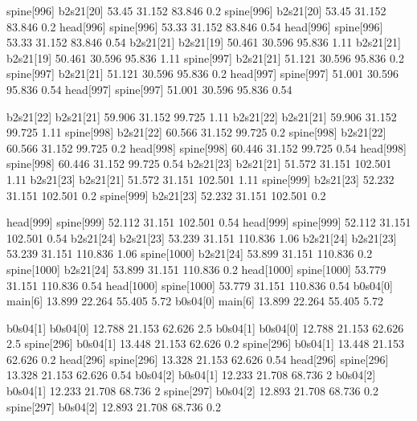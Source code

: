 spine[996]    b2s21[20]    53.45    31.152    83.846    0.2
spine[996]    b2s21[20]    53.45    31.152    83.846    0.2
head[996]    spine[996]    53.33    31.152    83.846    0.54
head[996]    spine[996]    53.33    31.152    83.846    0.54
b2s21[21]    b2s21[19]    50.461    30.596    95.836    1.11
b2s21[21]    b2s21[19]    50.461    30.596    95.836    1.11
spine[997]    b2s21[21]    51.121    30.596    95.836    0.2
spine[997]    b2s21[21]    51.121    30.596    95.836    0.2
head[997]    spine[997]    51.001    30.596    95.836    0.54
head[997]    spine[997]    51.001    30.596    95.836    0.54


b2s21[22]    b2s21[21]    59.906    31.152    99.725    1.11
b2s21[22]    b2s21[21]    59.906    31.152    99.725    1.11
spine[998]    b2s21[22]    60.566    31.152    99.725    0.2
spine[998]    b2s21[22]    60.566    31.152    99.725    0.2
head[998]    spine[998]    60.446    31.152    99.725    0.54
head[998]    spine[998]    60.446    31.152    99.725    0.54
b2s21[23]    b2s21[21]    51.572    31.151    102.501    1.11
b2s21[23]    b2s21[21]    51.572    31.151    102.501    1.11
spine[999]    b2s21[23]    52.232    31.151    102.501    0.2
spine[999]    b2s21[23]    52.232    31.151    102.501    0.2


head[999]    spine[999]    52.112    31.151    102.501    0.54
head[999]    spine[999]    52.112    31.151    102.501    0.54
b2s21[24]    b2s21[23]    53.239    31.151    110.836    1.06
b2s21[24]    b2s21[23]    53.239    31.151    110.836    1.06
spine[1000]    b2s21[24]    53.899    31.151    110.836    0.2
spine[1000]    b2s21[24]    53.899    31.151    110.836    0.2
head[1000]    spine[1000]    53.779    31.151    110.836    0.54
head[1000]    spine[1000]    53.779    31.151    110.836    0.54
b0s04[0]    main[6]    13.899    22.264    55.405    5.72
b0s04[0]    main[6]    13.899    22.264    55.405    5.72


b0s04[1]    b0s04[0]    12.788    21.153    62.626    2.5
b0s04[1]    b0s04[0]    12.788    21.153    62.626    2.5
spine[296]    b0s04[1]    13.448    21.153    62.626    0.2
spine[296]    b0s04[1]    13.448    21.153    62.626    0.2
head[296]    spine[296]    13.328    21.153    62.626    0.54
head[296]    spine[296]    13.328    21.153    62.626    0.54
b0s04[2]    b0s04[1]    12.233    21.708    68.736    2
b0s04[2]    b0s04[1]    12.233    21.708    68.736    2
spine[297]    b0s04[2]    12.893    21.708    68.736    0.2
spine[297]    b0s04[2]    12.893    21.708    68.736    0.2


